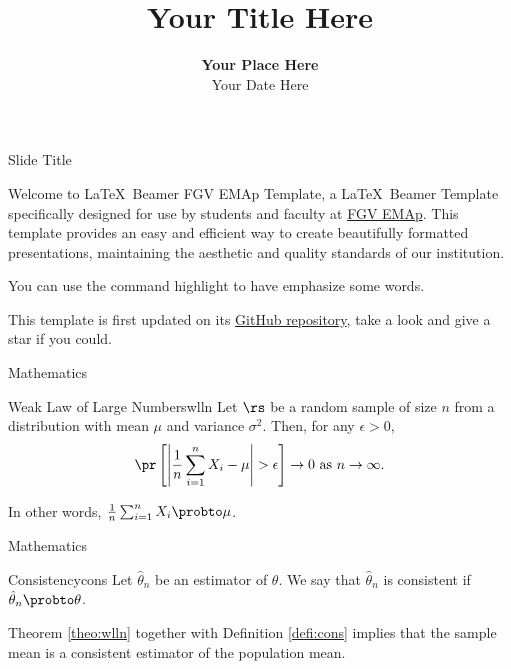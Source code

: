 \documentclass[xcolor=dvipsnames,t,aspectratio=169]{beamer} %
\title{Your Title Here}
\author{
    \newauthor{Crazy Frog}{crazy.frog@music.br}
    \newauthor{Michael Jackson}{whosbad@music.br} %
}
\date{{\color{fgv_dark_blue}  \textbf{Your Place Here}\\ Your Date Here }}
\newcommand{\highlight}[1]{{\color{fgv_light_blue} #1}}
\begin{document}
\frame[plain]{\titlepage}
\setcounter{framenumber}{0}

\begin{frame}[c]{Slide Title}

    Welcome to \LaTeX\ Beamer FGV EMAp Template, a \LaTeX\ Beamer Template specifically designed for use by students and faculty at \href{https://emap.fgv.br/en}{FGV EMAp}. This template provides an easy and efficient way to create beautifully formatted presentations, maintaining the aesthetic and quality standards of our institution.

    \begin{display}
    You can use the command \highlight{highlight} to have \highlight{emphasize} some words.
    \end{display}

    This template is first updated on its \href{https://github.com/adamesalles/latex-beamer-emap}{GitHub repository}, take a look and give a star if you could.


\end{frame}

\begin{frame}[c]{Mathematics}

    \begin{theo}{Weak Law of Large Numbers}{wlln} %
        Let $\rs$ be a random sample of size $n$ from a distribution with mean $\mu$ and variance $\sigma^2$. Then, for any $\epsilon > 0$,
        \begin{equation*}
            \pr\left[\left|\frac{1}{n}\sum_{i=1}^n X_i - \mu\right| > \epsilon\right] \to 0 \text{ as } n \to \infty.
        \end{equation*}

        In other words, $\frac{1}{n}\sum_{i=1}^n X_i \probto \mu$.
    \end{theo}
    
\end{frame}

\begin{frame}[c]{Mathematics}
    
        \begin{defi}{Consistency}{cons}
            Let $\hat{\theta}_n$ be an estimator of $\theta$. We say that $\hat{\theta}_n$ is \highlight{consistent} if $\hat{\theta}_n \probto \theta$.
        \end{defi}
    
        \begin{remark}{}{}
            Theorem \ref{theo:wlln} together with Definition \ref{defi:cons} implies that the sample mean is a consistent estimator of the population mean.
        \end{remark}
    
\end{frame}
\end{document}
